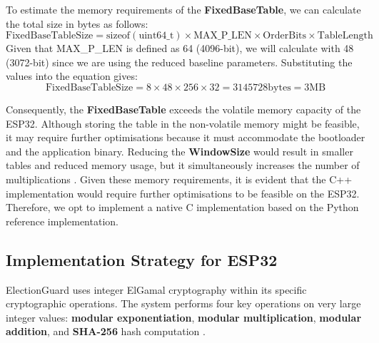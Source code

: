To estimate the memory requirements of the \textbf{FixedBaseTable}, we can calculate the total size in bytes as follows:
\begin{equation}
    \mathrm{FixedBaseTable Size} = \mathrm{sizeof(uint64\_t)} \times \mathrm{MAX\_P\_LEN} \times \mathrm{OrderBits} \times \mathrm{TableLength}
\end{equation}
Given that MAX\_P\_LEN is defined as 64 (4096-bit), we will calculate with 48 (3072-bit) since we are using the reduced baseline parameters. Substituting the values into the equation gives:
\begin{equation}
    \mathrm{FixedBaseTable Size} = 8 \times 48 \times 256 \times 32 =  3145728  \mathrm{ bytes} = 3 \mathrm{ MB}
\end{equation}

Consequently, the \textbf{FixedBaseTable} exceeds the volatile memory capacity of the ESP32. Although storing the table in the non-volatile memory might be feasible, it may require further optimisations because it must accommodate the bootloader and the application binary. Reducing the \textbf{WindowSize} would result in smaller tables and reduced memory usage, but it simultaneously increases the number of multiplications \cite[22]{eg-spec}. Given these memory requirements, it is evident that the C++ implementation would require further optimisations to be feasible on the ESP32. Therefore, we opt to implement a native C implementation based on the Python reference implementation.

\subsection{Implementation Strategy for ESP32}
ElectionGuard uses integer ElGamal cryptography within its specific cryptographic operations. The system performs four key operations on very large integer values: \textbf{modular exponentiation}, \textbf{modular multiplication}, \textbf{modular addition}, and \textbf{SHA-256} hash computation \cite[25]{eg-spec}. 

